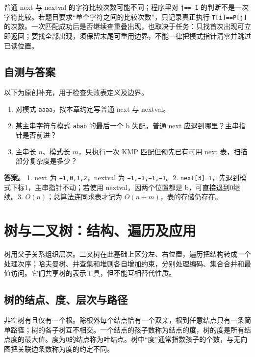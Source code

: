 普通 next 与 nextval 的字符比较次数可能不同；程序里对 \texttt{j==-1} 的判断不是一次字符比较。若题目要求``单个字符之间的比较次数''，只记录真正执行 \texttt{T{[}i{]}==P{[}j{]}} 的次数。一次匹配成功后是否继续查重叠出现，也取决于任务：只找首次出现可立即返回；要找全部出现，须保留末尾可重用边界，不能一律把模式指针清零并跳过已读位置。

\section{自测与答案}\label{ds-ch4-check}

以下为原创补充，用于检查失败表定义及边界。

\begin{enumerate}
\def\labelenumi{\arabic{enumi}.}
\tightlist
\item
  对模式 \texttt{aaaa}，按本章约定写普通 next 与 nextval。
\item
  某主串字符与模式 \texttt{abab} 的最后一个 b 失配，普通 next 应退到哪里？主串指针是否前进？
\item
  主串长 \(n\)、模式长 \(m\)，只执行一次 KMP 匹配但预先已有可用 next 表，扫描部分复杂度是多少？
\end{enumerate}

\textbf{答案。} 1. next 为 \texttt{−1,}\allowbreak{}\texttt{0,}\allowbreak{}\texttt{1,}\allowbreak{}\texttt{2}，nextval 为 \texttt{−1,}\allowbreak{}\texttt{−1,}\allowbreak{}\texttt{−1,}\allowbreak{}\texttt{−1}。2. \texttt{next{[}3{]}=1}，先退到模式下标1，主串指针不动；若使用 nextval，因两个位置都是 b，可直接退到0继续。3. \(O(n)\)；总算法连同求表才记为 \(O(n+m)\)，表的存储仍存在。

\chapter{树与二叉树：结构、遍历及应用}\label{ds-ch5}

树用父子关系组织层次。二叉树在此基础上区分左、右位置，遍历把结构转成一个处理次序；哈夫曼树、并查集和堆则各自增加约束，分别处理编码、集合合并和最值访问。它们共享树的表示工具，但不能互相替代性质。

\section{树的结点、度、层次与路径}\label{ds-05-01}

非空树有且仅有一个根。除根外每个结点恰有一个双亲，根到任意结点只有一条简单路径；树的各子树互不相交。一个结点的孩子数称为结点的\textbf{度}，树的度是所有结点度的最大值。度为0的结点称为叶结点。树中``度''通常指数孩子的个数，与无向图把关联边条数称为度的约定不同。

